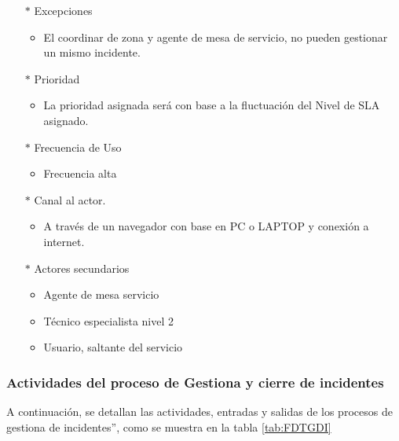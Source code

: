 \begin{multicols}{2}
\begin{itemize}
\begin{itemize}
		\end{itemize}
		\item[$*$]  Excepciones
		\begin{itemize}
			\item El coordinar de zona y agente de mesa de servicio, no pueden gestionar un mismo incidente. 		
		\end{itemize}
		\item[$*$]  Prioridad
		\begin{itemize}
			\item La prioridad asignada será con base a la fluctuación del Nivel de SLA asignado.
		\end{itemize}
		\item[$*$]  Frecuencia de Uso
		\begin{itemize}
			\item Frecuencia alta
		\end{itemize}
		\item[$*$]   Canal al actor.
		\begin{itemize}
			\item 	A través de un navegador con base en PC o LAPTOP y conexión a internet.
		\end{itemize}
		\item[$*$]  Actores secundarios
		\begin{itemize}
			\item Agente de mesa servicio 
			\item Técnico especialista nivel 2
			\item Usuario, saltante del servicio
			
		\end{itemize}
	\end{itemize}
	
\end{multicols}



\subsubsection{Actividades del proceso de Gestiona y cierre de incidentes}

A continuación, se detallan las actividades, entradas y salidas de los procesos de gestiona de incidentes”, como se muestra en la tabla \ref{tab:FDTGDI} 


